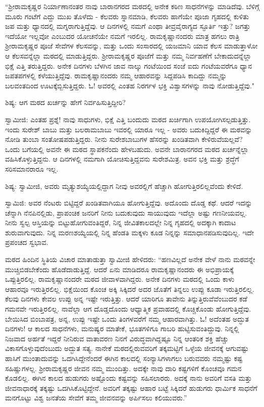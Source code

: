 “ಶ‍್ರೀರಾಮಕೃಷ್ಣರ ನಿರ್ಯಾಣಾನಂತರ ನಾವು ಬಾರಾನಗರದ ಮಠದಲ್ಲಿ ಅನೇಕ ಕಠಿಣ ಸಾಧನೆಗಳನ್ನು ಮಾಡಿದೆವು. ಬೆಳಿಗ್ಗೆ ಮೂರು ಗಂಟೆಗೆ ಎದ್ದು ಮುಖ ತೊಳೆದು - ಕೆಲವರು ಸ್ನಾನಮಾಡಿ, ಕೆಲವರು ಹಾಗೆಯೇ ಪೂಜಾ ಗೃಹದಲ್ಲಿ ಕುಳಿತು ಜಪ ಮತ್ತು ಧ್ಯಾನದಲ್ಲಿ ಮಗ್ನರಾಗುತ್ತಿದ್ದೆವು. ಆ ದಿನಗಳಲ್ಲಿ ನಮಗೆ ಎಂಥಾ ತೀವ್ರವೈರಾಗ್ಯದ ಸ್ಫೂರ್ತಿ ಇತ್ತು? ಜಗತ್ತು ಇದೆಯೋ ಇಲ್ಲವೋ ಎಂಬುದರ ಯೋಚನೆಯೇ ನಮಗೆ ಇರಲಿಲ್ಲ. ರಾಮಕೃಷ್ಣಾನಂದರು ಮಾತ್ರ ಹಗಲು ರಾತ್ರಿ ಶ‍್ರೀರಾಮಕೃಷ್ಣರ ಪೂಜೆ ಸೇವೆಗಳ ಕೆಲಸವನ್ನು, ಮತ್ತು ಒಂದು ಸಂಸಾರದಲ್ಲಿ ಯಜಮಾನಿ ಯಾವ ಕೆಲಸ ಮಾಡುತ್ತಾಳೋ ಆ ಕೆಲಸವನ್ನೆಲ್ಲಾ ಮಠದಲ್ಲಿ ಮಾಡುತ್ತಿದ್ದರು. ಶ‍್ರೀರಾಮಕೃಷ್ಣರ ಪೂಜೆಗೆ ಮತ್ತು ನಮ್ಮ ನಿರ್ವಹಣೆಗೆ ಬೇಕಾದುದನ್ನೆಲ್ಲಾ ಭಿಕ್ಷೆ ಎತ್ತಿ ತರುತ್ತಿದ್ದರು. ಅನೇಕ ದಿನಗಳು ಬೆಳಗಿನ ಜಾವ ನಾಲ್ಕು ಗಂಟೆಯಿಂದ ಸಂಜೆ ಐದು ಗಂಟೆಯವರೆಗೂ ಧ್ಯಾನ ಜಪತಪಗಳಲ್ಲಿ ಕಳೆಯುತ್ತಿದ್ದೆವು. ರಾಮಕೃಷ್ಣಾನಂದರು ನಮ್ಮ ಆಹಾರವನ್ನು ಸಿದ್ದಪಡಿಸಿ ಕಾದಿದ್ದು ನಮ್ಮನ್ನು ಬಲವಂತದಿಂದ ಊಟಕ್ಕೆಬ್ಬಿಸುತ್ತಿದ್ದರು. ಓ! ಅವರಲ್ಲಿ ಎಂತಹ ನಿರರ್ಗಳ ಭಕ್ತಿ ವಿಶ್ವಾಸಗಳನ್ನು ನಾವು ನೋಡುತ್ತಿದ್ದೆವು."

ಶಿಷ್ಯ: ಆಗ ಮಠದ ಖರ್ಚನ್ನು ಹೇಗೆ ನಿರ್ವಹಿಸುತ್ತಿದ್ದೀರಿ?

ಸ್ವಾಮೀಜಿ: ಎಂತಹ ಪ್ರಶ್ನೆ! ನಾವು ಸಾಧುಗಳು, ಭಿಕ್ಷೆ ಎತ್ತಿ ಬಂದುದು ಮಠದ ಖರ್ಚಿಗಾಗಿ ಉಪಯೋಗಿಸಲ್ಪಡುತ್ತಿತ್ತು. ಇಂದು ಸುರೇಶ್ ಬಾಬು ಮತ್ತು ಬಲರಾಮಬಾಬು ಇವರಲ್ಲಿ ಯಾರೂ ಇಲ್ಲ - ಅವರು ಬದುಕಿದ್ದಿದ್ದರೆ ಈ ಮಠವನ್ನು ನೋಡಿ ತುಂಬಾ ಸಂತೋಷಪಡುತ್ತಿದ್ದರು. ನೀನು ಸುರೇಶಬಾಬುಗಳ ಹೆಸರನ್ನು ಖಂಡಿತವಾಗಿ ಕೇಳಿರುವೆಯಲ್ಲವೆ? ಒಂದು ಬಗೆಯಲ್ಲಿ ಅವನೇ ಈ ಮಠದ ಸ್ಥಾಪಕನೆಂದು ಹೇಳಬಹುದು. ಅವನೇ ಬಾರಾನಗರದ ಮಠದ ಖರ್ಚನ್ನೆಲ್ಲಾ ವಹಿಸಿಕೊಳ್ಳುತ್ತಿದ್ದನು. ಆ ದಿನಗಳಲ್ಲಿ ನಮಗಾಗಿ ಯೋಚಿಸುತ್ತಿದ್ದವನು ಸುರೇಶಮಿತ್ರ. ಅವನ ಭಕ್ತಿ ಮತ್ತು ಶ್ರದ್ಧೆಗೆ ಸರಿಸಮಾನರಾರೂ ಇಲ್ಲ.

ಶಿಷ್ಯ: ಸ್ವಾಮೀಜಿ, ಅವರು ಮೃತ್ಯುಶಯ್ಯೆಯಲ್ಲಿದ್ದಾಗ ನೀವು ಅವರಲ್ಲಿಗೆ ಹೆಚ್ಚಾಗಿ ಹೋಗುತ್ತಿರಲಿಲ್ಲವೆಂದು ಕೇಳಿದೆ.

ಸ್ವಾಮಿಜಿ: ಅವರ ನೆಂಟರು ಬಿಟ್ಟಿದ್ದರೆ ಖಂಡಿತವಾಗಿಯೂ ಹೋಗುತ್ತಿದ್ದೆವು. ಅದೊಂದು ದೊಡ್ಡ ಕಥೆ. ಆದರೆ ಇದನ್ನು ಚೆನ್ನಾಗಿ ನೆನಪಿನಲ್ಲಿಡು, ಪ್ರಾಪಂಚಿಕ ಜನರಿಗೆ ನೀನು ಬದುಕುವುದು ಸಾಯುವುದು ಇದೆಲ್ಲಾ ಅಷ್ಟು ಗಣನೀಯವಲ್ಲ. ನೀನು ಸ್ವಲ್ಪ ಆಸ್ತಿಯನ್ನು ಬಿಟ್ಟುಹೋಗುವಂತಿದ್ದರೆ, ನಿನ್ನ ಜೀವಿತಕಾಲದಲ್ಲೇ ನಿನ್ನ ಗೃಹದಲ್ಲಿ ಅದಕ್ಕಾಗಿ ಕಾದಾಟ ಶುರುವಾಗುವುದು. ನಿನ್ನ ಮರಣಶಯ್ಯೆಯಲ್ಲಿ ನಿನ್ನ ಹೆಂಡತಿ ಮಕ್ಕಳು ಕೂಡ ನಿನ್ನನ್ನು ಸಮಾಧಾನಪಡಿಸುವುದಿಲ್ಲ. ಇದೇ ಪ್ರಪಂಚದ ಸ್ವಭಾವ.

ಮಠದ ಹಿಂದಿನ ಸ್ಥಿತಿಯ ವಿಚಾರ ಮಾತಾಡುತ್ತಾ ಸ್ವಾಮೀಜಿ ಹೇಳಿದರು: “ಹಣವಿಲ್ಲದೆ ಅನೇಕ ವೇಳೆ ನಾನು ಮಠವನ್ನೇ ಮುಚ್ಚಿಬಿಡಬೇಕೆಂದು ಹೊಡೆದಾಡುತ್ತಿದ್ದೆ. ಆದರೆ ಏನು ಮಾಡಿದರೂ ರಾಮಕೃಷ್ಣಾನಂದರು ಈ ಅಭಿಪ್ರಾಯಕ್ಕೆ ಒಪ್ಪುತ್ತಿರಲಿಲ್ಲ. ರಾಮಕೃಷ್ಣಾನಂದರೇ ಮಠದ ಜೀವಾಳವಾಗಿದ್ದರು. ಅನೇಕ ದಿನಗಳು ಮಠದಲ್ಲಿ ಒಂದು ಕಾಳು ಆಹಾರವೂ ಇರುತ್ತಿರಲಿಲ್ಲ. ಭಿಕ್ಷೆಯಿಂದ ಕೊಂಚ ಅಕ್ಕಿ ಸಿಕ್ಕಿದರೆ ಅದರ ಜೊತೆಗೆ ತಿನ್ನಲು ಉಪ್ಪು ಕೂಡಾ ಇರುತ್ತಿರಲಿಲ್ಲ. ಕೆಲವು ದಿನಗಳು ಕೇವಲ ಉಪ್ಪು ಅನ್ನ ಇಷ್ಟೇ ಇರುತ್ತಿತ್ತು. ಆದರೆ ಯಾರಿಗೂ ತಾವೇನು ತಿನ್ನುತ್ತಿರುವೆವೆಂಬುದರ ಕಡೆ ಗಮನವೇ ಇರುತ್ತಿರಲಿಲ್ಲ. ನಾವೆಲ್ಲಾ ಆಗ ದೊಡ್ಡದೊಂದು ಆಧ್ಯಾತ್ಮಿಕ ಪ್ರವಾಹದಲ್ಲಿ ಕೊಚ್ಚಿಕೊಂಡು ಹೋಗುತ್ತಿದ್ದೆವು. ಬೇಯಿಸಿದ ಬಿಂಬಾಪತ್ರ, ಅನ್ನ, ಉಪ್ಪು ಇಷ್ಟೇ ಒಂದು ತಿಂಗಳವರೆಗೆ ನಮ್ಮ ಆಹಾರವಾಗಿತ್ತು. ಓ! ಅದೆಂತಹ ಅದ್ಭುತ ದಿನಗಳು! ಆ ಕಾಲದ ಸಾಧನೆಗಳು, ಮನುಷ್ಯರ ಮಾತೇಕೆ, ಭೂತಗಳಿಗೂ ಗಾಬರಿ ಹುಟ್ಟಿಸುವಂತಿದ್ದುವು. ನಿನ್ನಲ್ಲಿ ನಿಜವಾದ ಅರ್ಹತೆ ಇದ್ದರೆ ನೀನಿರುವ ವಾತಾವರಣ ನಿನಗೆ ವಿರುದ್ಧವಾಗಿದ್ದಷ್ಟೂ ನಿನ್ನ ಆಂತರಿಕ ಶಕ್ತಿ ಹೆಚ್ಚು ವಿಕಾಸಗೊಳ್ಳುವುದೆಂಬುದು ಅದ್ಭುತ ಸತ್ಯ. ನಾನೇಕೆ ಮಠದಲ್ಲಿರುವವರಿಗೆ ತಕ್ಕಮಟ್ಟಿಗೆ ಒಳ್ಳೆಯ ಜೀವನಕ್ಕೆ ಆಗುವಷ್ಟು ಹಾಸಿಗೆ ಮುಂತಾದುವನ್ನು ಒದಗಿಸಿದ್ದೇನೆಂದರೆ ಈಗಿನ ಕಾಲದಲ್ಲಿ ಸಂನ್ಯಾಸಿಗಳಾಗಲು ಬರುವವರು ನಮ್ಮಷ್ಟು ಕಷ್ಟ ಸಹಿಷ್ಣುಗಳಲ್ಲ. ಶ‍್ರೀರಾಮಕೃಷ್ಣರ ಜೀವನ ನಮ್ಮ ಮುಂದಿತ್ತು. ಅದಕ್ಕೇ ನಾವು ದಾರಿ ಕಷ್ಟಗಳಿಗೆ ಕೊಂಚವೂ ಗಮನ ಕೊಡಲಿಲ್ಲ. ಈಗಿನ ಕಾಲದ ಹುಡುಗರು ಅಷ್ಟೊಂದು ಕಷ್ಟವನ್ನು ಸಹಿಸಲಾರರು. ಅದಕ್ಕೆ ನಾನು ಅವರಿಗೆ ವಸತಿ ಮತ್ತು ಜೀವನಾಧಾರಕ್ಕೆ ತಕ್ಕಷ್ಟು ಒದಗಿಸಿಕೊಟ್ಟಿದ್ದೇನೆ. ಅವರಿಗೆ ತಕ್ಕಷ್ಟು ಆಹಾರ ಬಟ್ಟೆ ಸಿಕ್ಕಿದರೆ ಹುಡುಗರು ಧಾರ್ಮಿಕ ಸಾಧನೆಗೆ ಮನಗೊಟ್ಟು ವಿಶ್ವ ಜನತೆಯ ಸೇವೆಗೆ ತಮ್ಮ ಜೀವನವನ್ನು ಅರ್ಪಿಸಲು ಕಲಿಯುವರು.”

